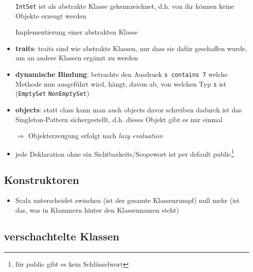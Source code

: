 \begin{itemize}
  
  
  \texttt{IntSet} ist als abstrakte Klasse gekennzeichnet, d.h. von ihr können
  keine Objekte erzeugt werden
  
  Implementierung einer abstrakten Klasse
  
  
  
  \item \textbf{traits}: traits sind wie abstrakte Klassen, nur dass sie
  dafür geschaffen wurde, um an andere Klassen ergänzt zu werden
  
  
  \item \textbf{dynamische Bindung}: betrachte den Ausdruck 
  \texttt{s contains 7} \und welche Methode nun ausgeführt wird, hängt, davon
  ab, von welchen Typ \texttt{s} ist (\texttt{EmptySet} \oder 
  \texttt{NonEmptySet})
  \item \textbf{objects}: statt class kann man auch objects davor schreiben
  \und dadurch ist das Singleton-Pattern sichergestellt, d.h. dieses
  Objekt gibt es nur einmal
  
  
  
  $\Rightarrow$ Objekterzeugung erfolgt nach \textit{lazy evaluation}
  \item jede Deklaration ohne ein Sichtbarkeits/Scopewort ist per default
  public\footnote{für public gibt es kein Schlüsselwort}
\end{itemize}


\subsection{Konstruktoren}
\begin{itemize}
  \item Scala unterscheidet zwischen  (ist der gesamte Klassenrumpf) \und null \oder mehr  (ist das, was in Klammern hinter den Klassennamen steht)
  
  
\end{itemize}


\subsection{verschachtelte Klassen}



